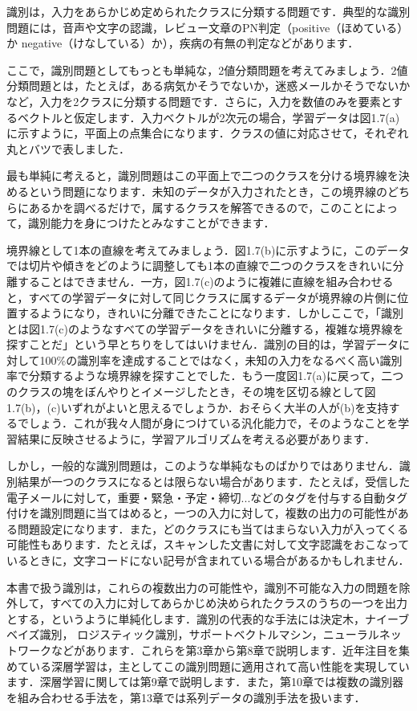 
識別は，入力をあらかじめ定められたクラスに分類する問題です．典型的な識別問題には，音声や文字の認識，レビュー文章のPN判定（positive（ほめている）か negative（けなしている）か），疾病の有無の判定などがあります．

ここで，識別問題としてもっとも単純な，2値分類問題を考えてみましょう．2値分類問題とは，たとえば，ある病気かそうでないか，迷惑メールかそうでないかなど，入力を2クラスに分類する問題です．さらに，入力を数値のみを要素とするベクトルと仮定します．入力ベクトルが2次元の場合，学習データは図1.7(a)に示すように，平面上の点集合になります．クラスの値に対応させて，それぞれ丸とバツで表しました．

最も単純に考えると，識別問題はこの平面上で二つのクラスを分ける境界線を決めるという問題になります．未知のデータが入力されたとき，この境界線のどちらにあるかを調べるだけで，属するクラスを解答できるので，このことによって，識別能力を身につけたとみなすことができます．

境界線として1本の直線を考えてみましょう．図1.7(b)に示すように，このデータでは切片や傾きをどのように調整しても1本の直線で二つのクラスをきれいに分離することはできません．一方，図1.7(c)のように複雑に直線を組み合わせると，すべての学習データに対して同じクラスに属するデータが境界線の片側に位置するようになり，きれいに分離できたことになります．しかしここで，「識別とは図1.7(c)のようなすべての学習データをきれいに分離する，複雑な境界線を探すことだ」という早とちりをしてはいけません．識別の目的は，学習データに対して100\%の識別率を達成することではなく，未知の入力をなるべく高い識別率で分類するような境界線を探すことでした．もう一度図1.7(a)に戻って，二つのクラスの塊をぼんやりとイメージしたとき，その塊を区切る線として図1.7(b)，(c)いずれがよいと思えるでしょうか．おそらく大半の人が(b)を支持するでしょう．これが我々人間が身につけている汎化能力で，そのようなことを学習結果に反映させるように，学習アルゴリズムを考える必要があります．

しかし，一般的な識別問題は，このような単純なものばかりではありません．識別結果が一つのクラスになるとは限らない場合があります．たとえば，受信した電子メールに対して，重要・緊急・予定・締切...などのタグを付与する自動タグ付けを識別問題に当てはめると，一つの入力に対して，複数の出力の可能性がある問題設定になります．また，どのクラスにも当てはまらない入力が入ってくる可能性もあります．たとえば，スキャンした文書に対して文字認識をおこなっているときに，文字コードにない記号が含まれている場合があるかもしれません．

本書で扱う識別は，これらの複数出力の可能性や，識別不可能な入力の問題を除外して，すべての入力に対してあらかじめ決められたクラスのうちの一つを出力とする，というように単純化します．識別の代表的な手法には決定木，ナイーブベイズ識別， ロジスティック識別，サポートベクトルマシン，ニューラルネットワークなどがあります．これらを第3章から第8章で説明します．近年注目を集めている深層学習は，主としてこの識別問題に適用されて高い性能を実現しています．深層学習に関しては第9章で説明します．また，第10章では複数の識別器を組み合わせる手法を，第13章では系列データの識別手法を扱います．


